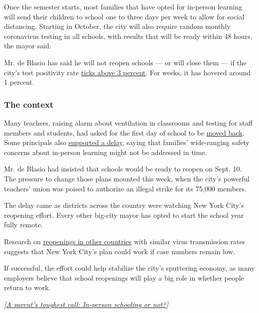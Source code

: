 Once the semester starts, most families that have opted for in-person
learning will send their children to school one to three days per week
to allow for social distancing. Starting in October, the city will also
require random monthly coronavirus testing in all schools, with results
that will be ready within 48 hours, the mayor said.

Mr. de Blasio has said he will not reopen schools --- or will close them
--- if the city's test positivity rate
\href{https://www.nytimes3xbfgragh.onion/2020/08/05/nyregion/nyc-schools-reopening.html}{ticks
above 3 percent}. For weeks, it has hovered around 1 percent.

\hypertarget{the-context}{%
\subsubsection{The context}\label{the-context}}

Many teachers, raising alarm about ventilation in classrooms and testing
for staff members and students, had asked for the first day of school to
be
\href{https://www.nytimes3xbfgragh.onion/2020/08/18/nyregion/schools-reopen-nyc.html}{moved
back}. Some principals also
\href{https://www.nytimes3xbfgragh.onion/2020/08/14/nyregion/nyc-schools-reopening-plan.html}{supported
a delay}, saying that families' wide-ranging safety concerns about
in-person learning might not be addressed in time.

Mr. de Blasio had insisted that schools would be ready to reopen on
Sept. 10. The pressure to change those plans mounted this week, when the
city's powerful teachers' union was poised to authorize an illegal
strike for its 75,000 members.

The delay came as districts across the country were watching New York
City's reopening effort. Every other big-city mayor has opted to start
the school year fully remote.

Research on
\href{https://www.nytimes3xbfgragh.onion/2020/08/26/world/europe/germany-schools-virus-reopening.html}{reopenings
in other countries} with similar virus transmission rates suggests that
New York City's plan could work if case numbers remain low.

If successful, the effort could help stabilize the city's sputtering
economy, as many employers believe that school reopenings will play a
big role in whether people return to work.

\emph{{[}}\href{https://www.nytimes3xbfgragh.onion/2020/09/01/health/coronavirus-parents-schools.html}{\emph{A
parent's toughest call: In-person schooling or not?}}\emph{{]}}

